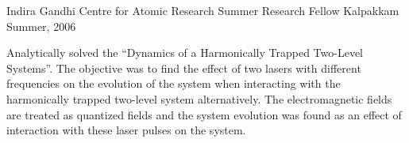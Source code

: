 \begin{cventries}
	
	\cventry
	{Indira Gandhi Centre for Atomic Research} %
	{Summer Research Fellow} %
	{Kalpakkam} %
	{Summer, 2006} %
	{
		\begin{cvitems} 
			\item {Analytically solved the “Dynamics of a Harmonically Trapped Two-Level
				Systems”. The objective was to find the effect of two lasers with different frequencies on the evolution of the system when interacting with the harmonically trapped two-level system alternatively. The electromagnetic fields are treated as quantized fields and the system evolution was found as an effect of interaction with these laser pulses on the system. }
		\end{cvitems}
	}

\end{cventries}

